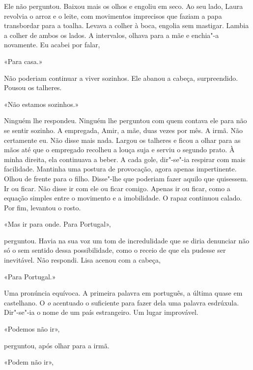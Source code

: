 Ele não perguntou. Baixou mais os olhos e engoliu em seco. Ao seu lado,
Laura revolvia o arroz e o leite, com movimentos imprecisos que faziam a
papa transbordar para a toalha. Levava a colher à boca, engolia sem
mastigar. Lambia a colher de ambos os lados. A intervalos, olhava para a
mãe e enchia"-a novamente. Eu acabei por falar,

«Para casa.»

Não poderiam continuar a viver sozinhos. Ele abanou a cabeça,
surpreendido. Pousou os talheres.

«Não estamos sozinhos.»

Ninguém lhe respondeu. Ninguém lhe perguntou com quem contava ele para
não se sentir sozinho. A empregada, Amir, a mãe, duas vezes por mês. A
irmã. Não certamente eu. Não disse mais nada. Largou os talheres e ficou
a olhar para as mãos até que o empregado recolheu a louça suja e serviu
o segundo prato. À minha direita, ela continuava a beber. A cada gole,
dir"-se"-ia respirar com mais facilidade. Mantinha uma postura de
provocação, agora apenas impertinente. Olhou de frente para o filho.
Disse"-lhe que poderiam fazer aquilo que quisessem. Ir ou ficar. Não
disse ir com ele ou ficar comigo. Apenas ir ou ficar, como a equação
simples entre o movimento e a imobilidade. O rapaz continuou calado. Por
fim, levantou o rosto.

«Mas ir para onde. Para Portugal»,

perguntou. Havia na sua voz um tom de incredulidade que se diria
denunciar não só o sem sentido dessa possibilidade, como o receio de que
ela pudesse ser inevitável. Não respondi. Lisa acenou com a cabeça,

«Para Portugal.»

Uma pronúncia equívoca. A primeira palavra em português, a última quase
em castelhano. O \emph{o} acentuado o suficiente para fazer dela uma
palavra esdrúxula. Dir"-se"-ia o nome de um país estrangeiro. Um lugar
improvável.

«Podemos não ir»,

perguntou, após olhar para a irmã.

«Podem não ir»,

